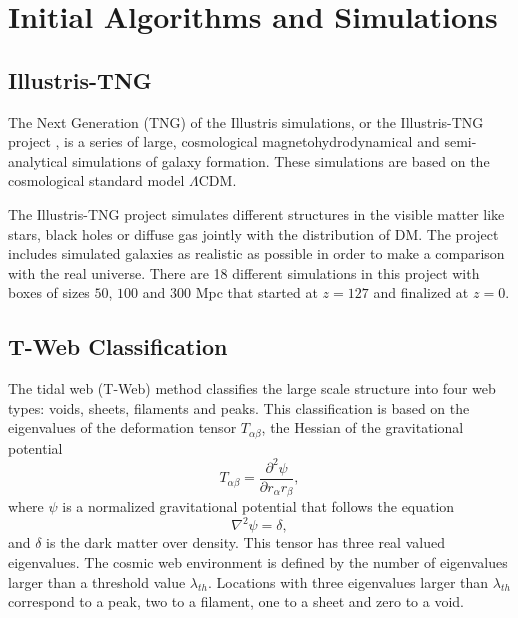 \documentclass[usenatbib]{mnras}
\begin{document}
\section{Initial Algorithms and Simulations}\label{sec:init}

\subsection{Illustris-TNG}

The Next Generation (TNG) of the Illustris simulations, or the
Illustris-TNG project \citep{Nelson2015},  is a series of large,
cosmological magnetohydrodynamical and semi-analytical simulations of
galaxy formation. 
These simulations are based on the cosmological standard model
$\Lambda$CDM.  

The Illustris-TNG project simulates different structures in the
visible matter like stars, black holes or diffuse gas jointly with the
distribution of DM.
The project includes simulated galaxies as realistic as possible in
order to make a comparison with the real universe. There are 18
different simulations in this project with boxes of sizes $50$, $100$ and
$300$ Mpc that started at $z=127$ and finalized at $z=0$.   

\subsection{T-Web Classification}

The tidal web (T-Web) method \citep{Hahn2007,Forero-Romero2009}
classifies the large scale structure into four web types: voids,
sheets, filaments and peaks.   
This classification is based on the eigenvalues of the deformation
tensor $T_{\alpha\beta}$, the Hessian of the gravitational potential 
\begin{equation}
T_{\alpha\beta}=\frac{\partial^2\psi}{\partial r_{\alpha}r_{\beta}},
\end{equation}
%
where $\psi$ is a normalized gravitational potential that follows the equation
\begin{equation}
    \nabla^2 \psi = \delta,
\end{equation}
%
and $\delta$ is the dark matter over density.
This tensor has three real valued eigenvalues. 
The cosmic web environment is defined by the number of eigenvalues
larger than a threshold value $\lambda_{th}$.
Locations with three eigenvalues larger than $\lambda_{th}$ correspond
to a peak, two to a filament, one to a sheet and zero to a void. 
\end{document}
